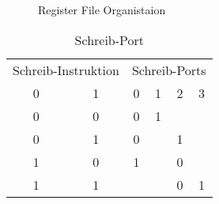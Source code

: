 \begin{figure}[htbp] 
	\centering
	
	\caption{Register File Organistaion }
	\label{fig:reg_orga}
\end{figure}


\begin{table}[htbp]
	
	\begin{minipage}{.4\textwidth}
		\flushleft
		\begin{tabular}{cccccc}
			\multicolumn{2}{l}{Schreib-Instruktion}                 & \multicolumn{4}{|l}{Schreib-Ports}                                                               \\ 
			\multicolumn{1}{c}{0} & \multicolumn{1}{c}{1} & \multicolumn{1}{|c}{0} & \multicolumn{1}{c}{1} & \multicolumn{1}{c}{2} & \multicolumn{1}{c}{3} \\ 
			\hline
			\multicolumn{1}{c}{0} & \multicolumn{1}{c}{0} & \multicolumn{1}{|c}{0} & \multicolumn{1}{c}{1} & \multicolumn{1}{c}{} & \multicolumn{1}{c}{} \\ 
			\multicolumn{1}{c}{0} & \multicolumn{1}{c}{1} & \multicolumn{1}{|c}{0} & \multicolumn{1}{c}{} & \multicolumn{1}{c}{1} & \multicolumn{1}{c}{} \\ 
			\multicolumn{1}{c}{1} & \multicolumn{1}{c}{0} & \multicolumn{1}{|c}{1} & \multicolumn{1}{c}{} & \multicolumn{1}{c}{0} & \multicolumn{1}{c}{} \\ 
			\multicolumn{1}{c}{1} & \multicolumn{1}{c}{1} & \multicolumn{1}{|c}{} & \multicolumn{1}{c}{} & \multicolumn{1}{c}{0} &  \multicolumn{1}{c}{1}                   
		\end{tabular}
		\caption{\label{fig::schreib-port}Schreib-Port}
	\end{minipage}
	\hfill
	\begin{minipage}{.4\textwidth}
		\flushleft
		

\end{minipage}
\end{table}
